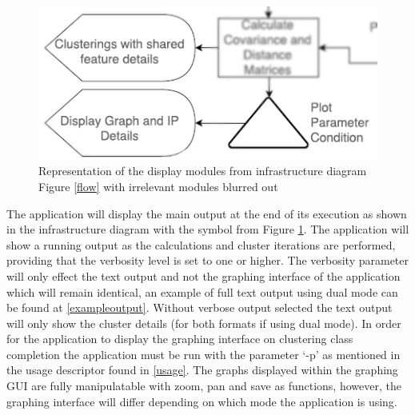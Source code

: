 \begin{figure}[!h]
\centering
\includegraphics{./Figures/display.png}
\caption{Representation of the display modules from infrastructure diagram Figure \ref{flow} with irrelevant modules blurred out}
\label{display}
\end{figure}

The application will display the main output at the end of its execution as shown in the infrastructure diagram with the symbol from Figure \ref{display}. The application will show a running output as the calculations and cluster iterations are performed, providing that the verbosity level is set to one or higher. The verbosity parameter will only effect the text output and not the graphing interface of the application which will remain identical, an example of full text output using dual mode can be found at \ref{exampleoutput}. Without verbose output selected the text output will only show the cluster details (for both formats if using dual mode). In order for the application to display the graphing interface on clustering class completion the application must be run with the parameter ‘-p' as mentioned in the usage descriptor found in \ref{usage}. The graphs displayed within the graphing GUI are fully manipulatable with zoom, pan and save as functions, however, the graphing interface will differ depending on which mode the application is using. \linebreak
